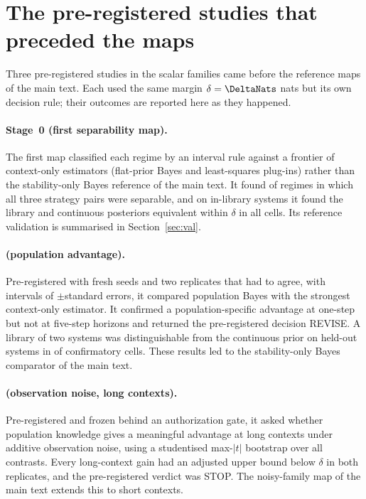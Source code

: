 \section{The pre-registered studies that preceded the maps}\label{app:history}
Three pre-registered studies in the scalar families came before the reference maps of the main text. Each used the same
margin $\delta=\DeltaNats$ nats but its own decision rule; their outcomes are reported here as they happened.

\paragraph{Stage~0 (first separability map).} The first map classified each regime by an interval rule against a frontier of
context-only estimators (flat-prior Bayes and least-squares plug-ins) rather than the stability-only Bayes reference of the
main text. It found \SzeroAllPairs of \SzeroCells regimes in which all three strategy pairs were separable, and on in-library
systems it found the library and continuous posteriors equivalent within $\delta$ in all \SzeroElibEquiv cells. Its
reference validation is summarised in Section~\ref{sec:val}.

\paragraph{\sHalf (population advantage).} Pre-registered with fresh seeds and two replicates that had to agree, with intervals
of $\pm$\SfiveIntervalSE standard errors, it compared population Bayes with the strongest context-only estimator. It confirmed a
population-specific advantage at one-step but not at five-step horizons and returned the pre-registered decision REVISE. A
library of two systems was distinguishable from the continuous prior on held-out systems in \LibSfiveDist of \LibSfiveCells
confirmatory cells. These results led to the stability-only Bayes comparator of the main text.

\paragraph{\sSix (observation noise, long contexts).} Pre-registered and frozen behind an authorization gate, it asked whether
population knowledge gives a meaningful advantage at long contexts under additive observation noise, using a studentised
max-$|t|$ bootstrap over all contrasts. Every long-context gain had an adjusted upper bound below $\delta$ in both replicates,
and the pre-registered verdict was STOP. The noisy-family map of the main text extends this to short contexts.

